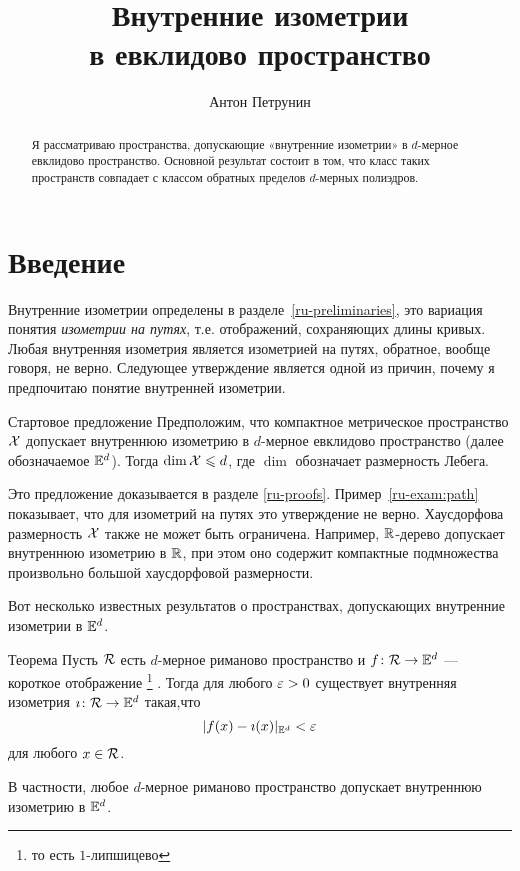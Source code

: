 \documentclass[oneside,a4paper]{article}
\begin{document}
\title{Внутренние изометрии \\
в евклидово пространство}
\author{Антон Петрунин}
\date{}
\maketitle

\begin{abstract}
Я рассматриваю пространства,
допускающие «внутренние изометрии» в $d$-мерное евклидово пространство.
Основной результат состоит в том, что класс таких пространств совпадает с классом обратных пределов $d$-мерных полиэдров. 
\end{abstract}

\section{Введение} 


Внутренние изометрии определены в разделе~\ref{ru-preliminaries}, это вариация понятия \emph{изометрии на путях}, т.е. отображений, сохраняющих длины кривых.
Любая внутренняя изометрия является изометрией на путях, обратное, вообще говоря, не верно.
Следующее утверждение является одной из причин, почему я предпочитаю понятие внутренней изометрии.

\begin{thm}{Стартовое предложение}\label{ru-top-dim}
Предположим, что компактное метрическое пространство $\mathcal{X}$ 
допускает внутреннюю изометрию в $d$-мерное евклидово пространство (далее обозначаемое $\mathbb{E}^d$).
Тогда 
$\mathop{\rm dim}\nolimits \mathcal{X}\leqslant d$,
где $\dim$ обозначает размерность Лебега.
\end{thm}

Это предложение доказывается в разделе \ref{ru-proofs}.
Пример~\ref{ru-exam:path} показывает,
что для изометрий на путях это утверждение не верно.
Хаусдорфова размерность $\mathcal{X}$ также не может быть ограничена.
Например, $\mathbb{R}$-дерево допускает внутреннюю изометрию в $\mathbb{R}$,
при этом оно содержит компактные подмножества произвольно большой хаусдорфовой размерности.

\medskip

Вот несколько известных результатов о пространствах, допускающих внутренние изометрии в $\mathbb{E}^d$.

\begin{thm}{Теорема}\label{ru-thm:gromov}
Пусть $\mathcal{R}$ есть $d$-мерное риманово пространство 
и $f\:\spc{R}\z\to\EE^d$ --- короткое отображение%
\footnote{то есть $1$-липшицево}%
.
Тогда для любого $\varepsilon>0$ 
существует внутренняя изометрия $\imath\colon\mathcal{R}\to\mathbb{E}^d$
такая,что
$$|f(x)-\imath(x)|_{\mathbb{E}^d}<\varepsilon$$
для любого $x\in \mathcal{R}$.

В частности, любое $d$-мерное риманово пространство 
допускает внутреннюю изометрию в $\mathbb{E}^d$.
\end{thm}
\end{document}

